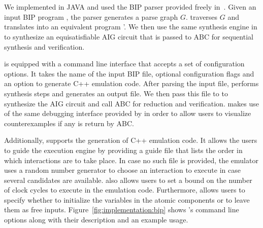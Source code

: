 \section{\biptool{}} \label{chap:implementation:bip}
We implemented \biptool{} in JAVA and used the BIP parser provided 
freely in~\cite{verimagbiponline}. Given an input BIP program \Pm, 
the parser generates a parse graph $G$. \biptool{} traverses $G$ 
and translates \Pm into an equivalent \thislanguage{} program 
\Pm'. We then use the same synthesis engine in \mytool{} to synthesize
an equisatisfiable AIG circuit \aigcircuit{} that is passed to ABC 
for sequential synthesis and verification.

\biptool{} is equipped with a command line interface that accepts a set
of configuration options. It takes the name of the input BIP file, optional 
configuration flags and an option to generate C++ emulation code. After 
parsing the input file, \mytool{} performs synthesis steps and generates 
an output \thislanguage{} file. 
We then pass this file to \mytool{} to synthesize the AIG circuit \aigcircuit{}
and call ABC for reduction and verification. \biptool{} makes use of the same debugging
interface provided by \mytool{} in order to allow users to visualize counterexamples
if any is return by ABC. 

Additionally, \mytool{} supports the generation of C++ emulation code. It allows
the users to guide the execution engine by providing a guide file
that lists the order in which interactions are to take place. In case no such file 
is provided, the emulator uses a random number generator to choose an interaction to execute
in case several candidates  are available. \biptool{} also allows
users to set a bound on the number of clock cycles to execute in the emulation code. 
Furthermore, \mytool{} allows users to specify whether to initialize the variables 
in the atomic components or to leave them as free inputs. Figure~\ref{fig:implementation:bip}
shows \biptool's command line options along with their description and an example usage. 

